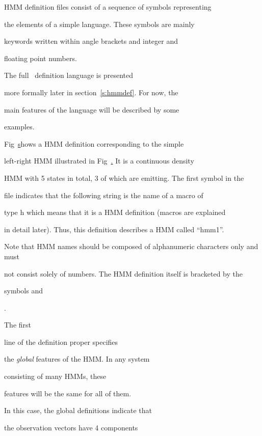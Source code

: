 HMM definition files consist of a sequence of symbols representing


the elements of a simple language.  These symbols are mainly


keywords written within angle brackets and integer and


floating point numbers. 


The full \HTK\ definition language is presented


more formally later in section~\ref{s:hmmdef}.  For now, the


main features of the language will be described by some


examples.





Fig~\href{f:hmm1def} shows a HMM definition corresponding to the simple


left-right HMM illustrated in Fig~\href{f:hmm1}.  It is a continuous density


HMM with 5 states in total, 3 of which are emitting.  The first symbol in the


file  indicates that the following string is the name of a macro of


type \textsf{h} which means that it is a HMM definition (macros are explained


in detail later).  Thus, this definition describes a HMM called ``hmm1''.  


Note that HMM names should be composed of alphanumeric characters only and must


not consist solely of numbers. The HMM definition itself is bracketed by the


symbols  and


.





The first 


line of the definition proper specifies


the \textit{global} features of the HMM.  In any system


consisting of many HMMs, these


features will be the same for all of them.


In this case, the global definitions indicate that


the observation vectors have 4 components


